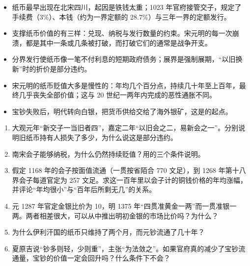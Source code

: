 \begin{takeaways}
\begin{itemize}
\item 纸币最早出现在北宋四川，起因是铁钱太重；1023 年官府接管交子，规定了手续费（3\%）、本钱（约为一界定额的 28.7\%）与三年一界的定额发行。
\item 支撑纸币价值的有三样：兑现、纳税与发行数量的约束。宋元明的每一次崩溃，都是其中一条或几条被打破，而打破它们的通常是战争开支。
\item 分界发行使纸币像一笔不付利息的短期政府债务；展界是强制展期，“以旧换新”时的折价是部分违约。
\item 宋元明的纸币贬值大多是慢性的：年均几个百分点，持续几十年至上百年，最终几乎丧失全部价值；这与 20 世纪一两年内完成的恶性通胀不同。
\item 宝钞失败后，明代转向白银，把货币供给交给了海外银矿，这是的起点。
\end{itemize}
\end{takeaways}

\begin{selfcheck}
\begin{enumerate}
\item 大观元年“新交子一当旧者四”，嘉定二年“以旧会之二，易新会之一”。分别说明旧纸币持有人损失了多少，为什么说这是部分违约。
\item 南宋会子能够纳税，为什么仍然持续贬值？用的三个条件说明。
\item 假定 1168 年的会子按面值流通（一贯按省陌合 770 文足），到 1268 年第十八界会子每道官定为 257 文足。求这一百年里以会子计的铜钱价格的年均涨幅，并评论“年均很小”与“百年后所剩无几”的关系。
\item 元 1287 年官定金银比价为 10，明 1375 年“四贯准黄金一两”而一贯准银一两。两者相差很大，可以从中推出明初金银的市场比价吗？为什么？
\item 为什么伊利汗国的纸币只维持了两个月，而元钞流通了几十年？
\item 夏原吉说“钞多则轻，少则重”，主张“为法敛之”。如果官府真的减少了宝钞流通量，宝钞的价值一定会回升吗？什么条件下不会？
\end{enumerate}
\end{selfcheck}

